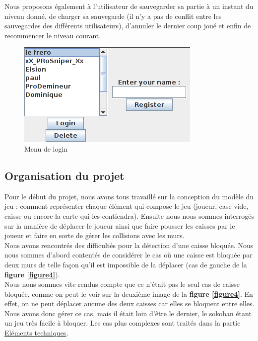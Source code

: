 \documentclass[a4paper,12pt]{article} %
\begin{document}
Nous proposons également à l'utilisateur de sauvegarder sa partie à un instant du niveau donné, de charger sa sauvegarde (il n'y a pas de conflit entre les sauvegardes des différents utilisateurs), d'annuler le dernier coup joué  et enfin de recommencer le niveau courant.

\begin{figure}[!h]
\centering
\includegraphics[scale=0.5]{images/login.png}
\caption{Menu de login}
\end{figure}

\subsection{Organisation du projet}

Pour le début du projet, nous avons tous travaillé sur la conception du modèle du jeu : comment représenter chaque élément qui compose le jeu (joueur, case vide, caisse ou encore la carte qui les contiendra). Ensuite nous nous sommes interrogés sur la manière de déplacer le joueur ainsi que faire pousser les caisses par le joueur et faire en sorte de gérer les collisions avec les murs.\\
Nous avons rencontrés des difficultés pour la détection d'une caisse bloquée. Nous nous sommes d'abord contentés de considérer le cas où une caisse est bloquée par deux murs de telle façon qu'il est impossible de la déplacer (cas de gauche de la \textbf{figure \ref{figure4}}).\\
Nous nous sommes vite rendus compte que ce n'était pas le seul cas de caisse bloquée, comme on peut le voir sur la deuxième image de la \textbf{figure \ref{figure4}}. En effet, on ne peut déplacer aucune des deux caisses car elles se bloquent entre elles. Nous avons donc gérer ce cas, mais il était loin d'être le dernier, le sokoban étant un jeu très facile à bloquer. Les cas plus complexes sont traités dans la partie \hyperref[et]{Eléments techniques}.
\end{document}
